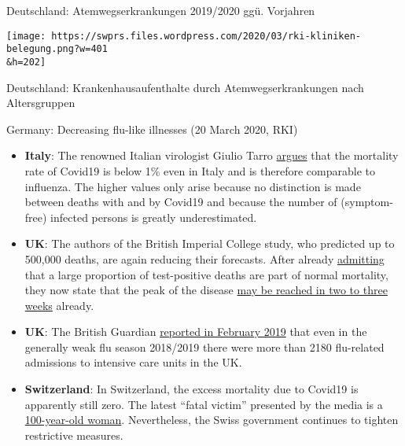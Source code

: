 Deutschland: Atemwegserkrankungen 2019/2020 ggü. Vorjahren

\href{https://swprs.org/covid-19-hinweis-ii/rki-kliniken-belegung/}{}

\texttt{[image: https://swprs.files.wordpress.com/2020/03/rki-kliniken-belegung.png?w=401\\\&h=202]}

Deutschland: Krankenhausaufenthalte durch Atemwegserkrankungen nach
Altersgruppen

Germany: Decreasing flu-like illnesses (20 March 2020, RKI)

\begin{itemize}
\tightlist
\item
  \textbf{Italy}: The renowned Italian virologist Giulio Tarro
  \href{https://www.cybermednews.eu/index.php/it/health/70871-interview-to-the-virologist-giulio-tarro-the-death-rate-of-covid-19-is-less-than-1-as-confirmed-by-the-national-institute-of-allergy-and-infectious-diseases}{argues}
  that the mortality rate of Covid19 is below 1\% even in Italy and is
  therefore comparable to influenza. The higher values only arise
  because no distinction is made between deaths with and by Covid19 and
  because the number of (symptom-free) infected persons is greatly
  underestimated.
\item
  \textbf{UK}: The authors of the British Imperial College study, who
  predicted up to 500,000 deaths, are again reducing their forecasts.
  After already
  \href{https://www.bbc.com/news/health-51979654}{admitting} that a
  large proportion of test-positive deaths are part of normal mortality,
  they now state that the peak of the disease
  \href{https://www.thetimes.co.uk/article/nhs-now-likely-to-cope-with-coronavirus-says-key-scientist-rn5m6nggk}{may
  be reached in two to three weeks} already.
\item
  \textbf{UK}: The British Guardian
  \href{https://www.theguardian.com/society/2019/feb/20/britons-urged-to-get-flu-vaccine-as-critical-cases-rise-above-2000}{reported
  in February 2019} that even in the generally weak flu season 2018/2019
  there were more than 2180 flu-related admissions to intensive care
  units in the UK.
\item
  \textbf{Switzerland}: In Switzerland, the excess mortality due to
  Covid19 is apparently still zero. The latest ``fatal victim''
  presented by the media is a
  \href{https://www.nau.ch/ort/basel/drei-weitere-covid-19-todesfalle-in-basel-stadt-65684099}{100-year-old
  woman}. Nevertheless, the Swiss government continues to tighten
  restrictive measures.
\end{itemize}

